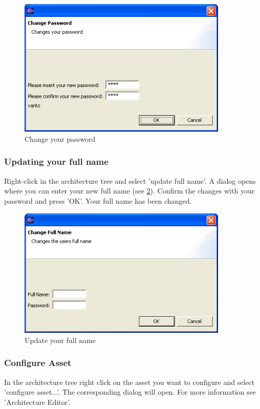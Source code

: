 \begin{figure}[h!]
\begin{center}
\includegraphics[width=10cm]{password.png}
   \caption{Change your password}
\label{password}
\end{center}
\end{figure}\par

\subsubsection{Updating your full name}
Right-click in the architecture tree and select 'update full name'. A dialog opens where you can
enter your new full name (see \ref{fullname}). Confirm the changes with your password and press 'OK'. Your full name has been changed.

\begin{figure}[h!]
\begin{center}
\includegraphics[width=10cm]{updatefullname.png}
   \caption{Update your full name}
\label{fullname}
\end{center}
\end{figure}\par

\subsubsection{Configure Asset}
In the architecture tree right click on the asset you want to configure and select
'configure asset...'. The corresponding dialog will open. For more information see
'Architecture Editor'.

